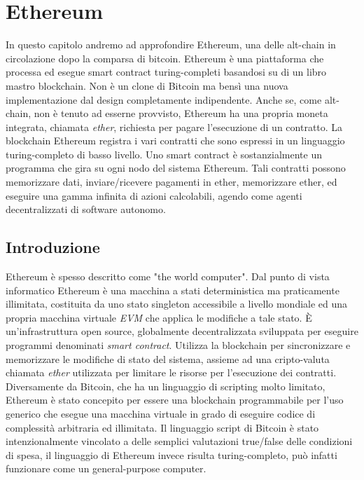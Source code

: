 
\chapter{Ethereum}
\label{ethereum-chapter}
In questo capitolo andremo ad approfondire Ethereum, una delle alt-chain in circolazione dopo la comparsa di bitcoin. Ethereum è una piattaforma che processa ed esegue smart contract turing-completi basandosi su di un libro mastro blockchain. Non è un clone di Bitcoin ma bensì una nuova implementazione dal design completamente indipendente. Anche se, come alt-chain, non è tenuto ad esserne provvisto, Ethereum ha una propria moneta integrata, chiamata \textit{ether}, richiesta per pagare l'esecuzione di un contratto. La blockchain Ethereum registra i vari contratti che sono espressi in un linguaggio turing-completo di basso livello. Uno smart contract è sostanzialmente un programma che gira su ogni nodo del sistema Ethereum. Tali contratti possono memorizzare dati, inviare/ricevere pagamenti in ether, memorizzare ether, ed eseguire una gamma infinita di azioni calcolabili, agendo come agenti decentralizzati di software autonomo.

\section{Introduzione}
Ethereum è spesso descritto come "the world computer". Dal punto di vista informatico Ethereum è una macchina a stati deterministica ma praticamente illimitata, costituita da uno stato singleton accessibile a livello mondiale ed una propria macchina virtuale \textit{EVM} che applica le modifiche a tale stato. \`E un'infrastruttura open source, globalmente decentralizzata sviluppata per eseguire programmi denominati \textit{smart contract}. Utilizza la blockchain per sincronizzare e memorizzare le modifiche di stato del sistema, assieme ad una cripto-valuta chiamata \textit{ether} utilizzata per limitare le risorse per l'esecuzione dei contratti. 
Diversamente da Bitcoin, che ha un linguaggio di scripting molto limitato, Ethereum è stato concepito per essere una blockchain programmabile per l'uso generico che esegue una macchina virtuale in grado di eseguire codice di complessità arbitraria ed illimitata. Il linguaggio script di Bitcoin è stato intenzionalmente vincolato a delle semplici valutazioni true/false delle condizioni di spesa, il linguaggio di Ethereum invece risulta turing-completo, può infatti funzionare come un general-purpose computer.

